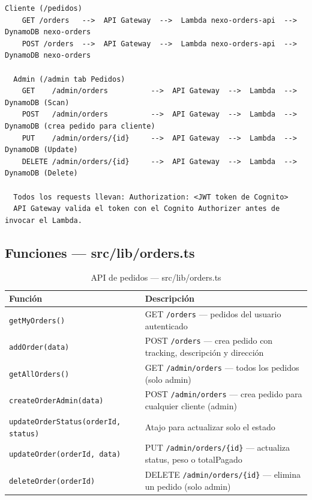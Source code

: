 \documentclass[12pt,a4paper]{article}
\begin{document}
\begin{lstlisting}[caption={Flujo del sistema de pedidos}, numbers=none]
  Cliente (/pedidos)
    GET /orders   -->  API Gateway  -->  Lambda nexo-orders-api  -->  DynamoDB nexo-orders
    POST /orders  -->  API Gateway  -->  Lambda nexo-orders-api  -->  DynamoDB nexo-orders

  Admin (/admin tab Pedidos)
    GET    /admin/orders          -->  API Gateway  -->  Lambda  -->  DynamoDB (Scan)
    POST   /admin/orders          -->  API Gateway  -->  Lambda  -->  DynamoDB (crea pedido para cliente)
    PUT    /admin/orders/{id}     -->  API Gateway  -->  Lambda  -->  DynamoDB (Update)
    DELETE /admin/orders/{id}     -->  API Gateway  -->  Lambda  -->  DynamoDB (Delete)

  Todos los requests llevan: Authorization: <JWT token de Cognito>
  API Gateway valida el token con el Cognito Authorizer antes de invocar el Lambda.
\end{lstlisting}

\subsection{Funciones --- src/lib/orders.ts}

\begin{table}[H]
\centering
\begin{tabular}{@{}ll@{}}
\toprule
\textbf{Función} & \textbf{Descripción} \\
\midrule
\texttt{getMyOrders()} & GET \texttt{/orders} --- pedidos del usuario autenticado \\
\texttt{addOrder(data)} & POST \texttt{/orders} --- crea pedido con tracking, descripción y dirección \\
\texttt{getAllOrders()} & GET \texttt{/admin/orders} --- todos los pedidos (solo admin) \\
\texttt{createOrderAdmin(data)} & POST \texttt{/admin/orders} --- crea pedido para cualquier cliente (admin) \\
\texttt{updateOrderStatus(orderId, status)} & Atajo para actualizar solo el estado \\
\texttt{updateOrder(orderId, data)} & PUT \texttt{/admin/orders/\{id\}} --- actualiza status, peso o totalPagado \\
\texttt{deleteOrder(orderId)} & DELETE \texttt{/admin/orders/\{id\}} --- elimina un pedido (solo admin) \\
\bottomrule
\end{tabular}
\caption{API de pedidos --- src/lib/orders.ts}
\end{table}
\end{document}
